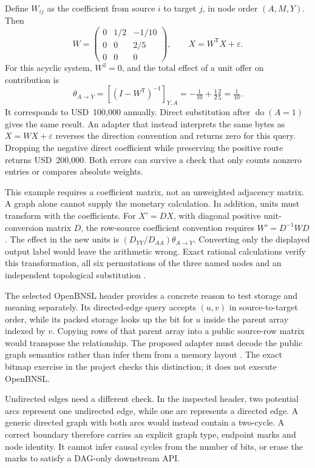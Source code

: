 Define \(W_{ij}\) as the coefficient from source \(i\) to target \(j\), in
node order \((A,M,Y)\). Then
\[
 W=\begin{pmatrix}0&1/2&-1/10\\0&0&2/5\\0&0&0\end{pmatrix},
 \qquad X=W^{\mathsf T}X+\varepsilon.
\]
For this acyclic system, \(W^3=0\), and the total effect of a unit offer on
contribution is
\begin{equation}
 \theta_{A\to Y}
 =[(I-W^{\mathsf T})^{-1}]_{Y,A}
 =-\tfrac1{10}+\tfrac12\tfrac25=\tfrac1{10}.
 \label{exec13:cxx-total-effect}
\end{equation}
It corresponds to USD~100,000 annually. Direct substitution after
\(\operatorname{do}(A=1)\) gives the same result. An adapter that instead
interprets the same bytes as \(X=WX+\varepsilon\) reverses the direction
convention and returns zero for this query. Dropping the negative direct
coefficient while preserving the positive route returns USD~200,000. Both
errors can survive a check that only counts nonzero entries or compares
absolute weights.

This example requires a coefficient matrix, not an unweighted adjacency
matrix. A graph alone cannot supply the monetary calculation. In addition,
units must transform with the coefficients. For \(X'=DX\), with diagonal
positive unit-conversion matrix \(D\), the row-source coefficient convention
requires \(W'=D^{-1}WD\). The effect in the new units is
\((D_{YY}/D_{AA})\theta_{A\to Y}\). Converting only the displayed output label
would leave the arithmetic wrong. Exact rational calculations verify this
transformation, all six permutations of the three named nodes and an
independent topological substitution \citep{exec13_cxx_examples}.

The selected OpenBNSL header provides a concrete reason to test storage and
meaning separately. Its directed-edge query accepts \((u,v)\) in source-to-target
order, while its packed storage looks up the bit for \(u\) inside the parent
array indexed by \(v\). Copying rows of that parent array into a public
source-row matrix would transpose the relationship. The proposed adapter
must decode the public graph semantics rather than infer them from a memory
layout \citep{exec13_cxx_openbnsl}. The exact bitmap exercise in the project
checks this distinction; it does not execute OpenBNSL.

Undirected edges need a different check. In the inspected header, two
potential arcs represent one undirected edge, while one arc represents a
directed edge. A generic directed graph with both arcs would instead contain
a two-cycle. A correct boundary therefore carries an explicit graph type,
endpoint marks and node identity. It cannot infer causal cycles from the
number of bits, or erase the marks to satisfy a DAG-only downstream API.

